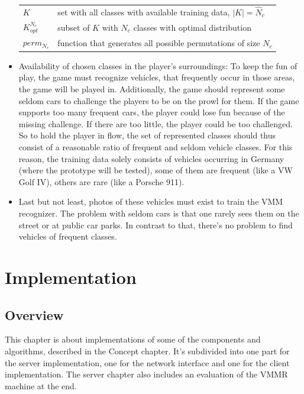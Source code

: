 \begin{itemize}
  \begin{tabular}{ll}
  $K$                     & set with all classes with available training data, $|K| = \hat N_c$ \\
  $K_{opt}^{N_c}$         & subset of $K$ with $N_c$ classes with optimal distribution \\
  $perm_{N_c}$            & function that generates all possible permutations of size $N_c$ \\
  \end{tabular}
  \item Availability of chosen classes in the player's surroundings: To keep the fun of play, the game must recognize vehicles, that frequently occur in those areas, the game will be played in. Additionally, the game should represent some seldom cars to challenge the players to be on the prowl for them. If the game supports too many frequent cars, the player could lose fun because of the missing challenge. If there are too little, the player could be too challenged. So to hold the player in flow, the set of represented classes should thus consist of a reasonable ratio of frequent and seldom vehicle classes. For this reason, the training data solely consists of vehicles occurring in Germany (where the prototype will be tested), some of them are frequent (like a VW Golf IV), others are rare (like a Porsche 911).
  \item Last but not least, photos of these vehicles must exist to train the VMM recognizer. The problem with seldom cars is that one rarely sees them on the street or at public car parks. In contrast to that, there's no problem to find vehicles of frequent classes.
\end{itemize}







\chapter{Implementation}\label{ch:implementation}
\section{Overview}
This chapter is about implementations of some of the components and algorithms, described in the Concept chapter. It's subdivided into one part for the server implementation, one for the network interface and one for the client implementation. The server chapter also includes an evaluation of the VMMR machine at the end.

